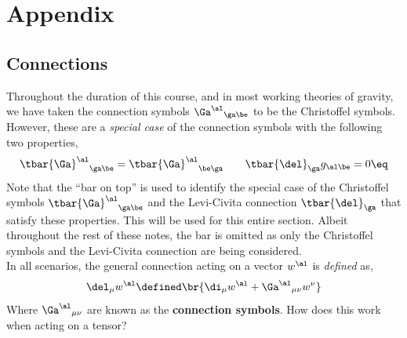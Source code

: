 \documentclass{article}
\begin{document}
\newpage
\section*{Appendix}
\setcounter{subsection}{0}
\setcounter{subsubsection}{0}
\renewcommand*{\theHsubsection}{appendix.\the\value{subsection}}
\renewcommand{\thesubsection}{\Alph{subsection}}
\subsection{Connections}
\label{sec:connections}
Throughout the duration of this course, and in most working theories of gravity, we have taken the connection symbols ${\Ga^\al}_{\ga\be}$ to be the Christoffel symbols. However, these are a \textit{special case} of the connection symbols with the following two properties,
\[ {\tbar{\Ga}^\al}_{\ga\be} = {\tbar{\Ga}^\al}_{\be\ga} \qquad \tbar{\del}_\ga g_{\al\be} = 0 \eq \label{eq:Christoffelproperties}\]
Note that the ``bar on top'' is used to identify the special case of the Christoffel symbols ${\tbar{\Ga}^\al}_{\ga\be}$ and the Levi-Civita connection $\tbar{\del}_\ga$ that satisfy these properties. This will be used for this entire section. Albeit throughout the rest of these notes, the bar is omitted as only the Christoffel symbols and the Levi-Civita connection are being considered.\\

In all scenarios, the general connection acting on a vector $w^\al$ is \textit{defined} as,
\[ \del_\mu w^\al \defined \br{\di_\mu w^\al + {\Ga^\al}_{\mu\nu} w^\nu} \]
Where ${\Ga^\al}_{\mu\nu}$ are known as the \textbf{connection symbols}. How does this work when acting on a tensor? \\
\end{document}
